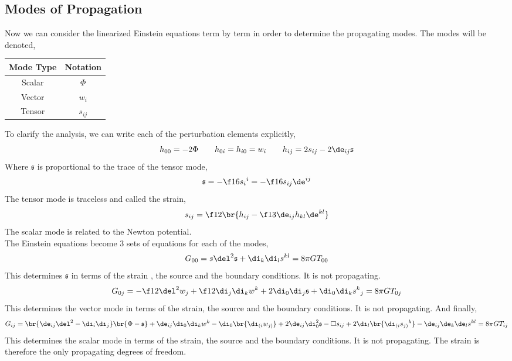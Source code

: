 \documentclass{article}
\begin{document}
\subsection{Modes of Propagation}
Now we can consider the linearized Einstein equations term by term in order to determine the propagating modes. The modes will be denoted,
\begin{center}
    \begin{tabular}{|c|c|}
        \hline
        Mode Type & Notation \\
        \hline
        Scalar & $\Phi$ \\
        Vector & $w_i$ \\
        Tensor & $s_{ij}$ \\
        \hline
    \end{tabular}
\end{center}
\newcommand{\gs}{\mathfrak{s}}
To clarify the analysis, we can write each of the perturbation elements explicitly,
\[ h_{00} = - 2 \Phi \qquad h_{0i} = h_{i0} = w_i \qquad h_{ij} = 2 s_{ij} - 2\de_{ij} \mathfrak{s} \]
Where $\gs$ is proportional to the trace of the tensor mode,
\[ \gs = -\f16 {s_{i}}^i = -\f16 s_{ij}\de^{ij} \]
The tensor mode is traceless and called the strain,
\[ s_{ij} = \f12\br{h_{ij} - \f13 \de_{ij}h_{kl}\de^{kl}} \]
The scalar mode is related to the Newton potential.\\

The Einstein equations become 3 sets of equations for each of the modes,
\[ G_{00} = s\del^2\gs + \di_k\di_ls^{kl} = 8 \pi G T_{00} \]
This determines $\gs$ in terms of the strain , the source and the boundary conditions. It is not propagating.
\[ G_{0j} = -\f12 \del^2 w_j + \f12 \di_j \di_k w^k + 2 \di_0 \di_j \gs + \di_0\di_k {s^{k}}_j = 8 \pi G T_{0j} \]
This determines the vector mode in terms of the strain, the source and the boundary conditions. It is not propagating. And finally,
\[ G_{ij} = \br{\de_{ij}\del^2 - \di_i\di_j}\br{\Phi - \gs} + \de_{ij} \di_0\di_k w^k - \di_0\br{\di_{(i}w_{j)}} + 2\de_{ij}\di_0^2\gs - \Box s_{ij} + 2 \di_l\br{\di_{(i}{s_{j)}}^k} - \de_{ij}\de_k\de_ls^{kl} = 8 \pi G T_{ij} \]
This determines the scalar mode in terms of the strain, the source and the boundary conditions. It is not propagating. The strain is therefore the only propagating degrees of freedom.
\end{document}
